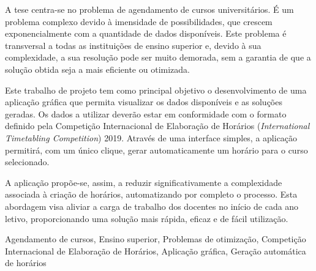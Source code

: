 
A tese centra-se no problema de agendamento de cursos universitários. É um problema complexo devido à imensidade de possibilidades, que crescem exponencialmente com a quantidade de dados disponíveis. Este problema é transversal a todas as instituições de ensino superior e, devido à sua complexidade, a sua resolução pode ser muito demorada, sem a garantia de que a solução obtida seja a mais eficiente ou otimizada.

Este trabalho de projeto tem como principal objetivo o desenvolvimento de uma aplicação gráfica que permita visualizar os dados disponíveis e as soluções geradas. Os dados a utilizar deverão estar em conformidade com o formato definido pela Competição Internacional de Elaboração de Horários (\textit{International Timetabling Competition}) 2019. Através de uma interface simples, a aplicação permitirá, com um único clique, gerar automaticamente um horário para o curso selecionado.

A aplicação propõe-se, assim, a reduzir significativamente a complexidade associada à criação de horários, automatizando por completo o processo. Esta abordagem visa aliviar a carga de trabalho dos docentes no início de cada ano letivo, proporcionando uma solução mais rápida, eficaz e de fácil utilização.

\begin{keywords}
Agendamento de cursos, Ensino superior, Problemas de otimização, Competição Internacional de Elaboração de Horários, Aplicação gráfica, Geração automática de horários
\end{keywords}
